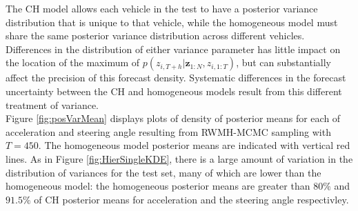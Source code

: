 \documentclass[12pt,a4paper]{article}\usepackage[]{graphicx}\usepackage[]{color}
\begin{document}
\begin{table}[ht]
\centering
{}
\caption{Mean forecast Euclidean error in metres for the the best Naive model, Naive 8, and each time series model at a forecast horizon of one second, two seconds and three seconds. Each time series model performs significantly better than Naive 8, and are very competitive with each other. The use of UVB for the IH model appears to have increased the forecast error relative to MCMC and VB inference for this model.}
\label{table:meanError}
\end{table}

The CH model allows each vehicle in the test to have a posterior variance distribution that is unique to that vehicle, while the homogeneous model must share the same posterior variance distribution across different vehicles. Differences in the distribution of either variance parameter has little impact on the location of the maximum of $p(z_{i, T+h} | \textbf{z}_{1:N}, z_{i, 1:T})$, but can substantially affect the precision of this forecast density. Systematic differences in the forecast uncertainty between the CH and homogeneous models result from this different treatment of variance.
\\

Figure \ref{fig:posVarMean} displays plots of density of posterior means for each of acceleration and steering angle resulting from RWMH-MCMC sampling with $T = 450$. The homogeneous model posterior means are indicated with vertical red lines. As in Figure \ref{fig:HierSingleKDE}, there is a large amount of variation in the distribution of variances for the test set, many of which are lower than the homogeneous model: the homogeneous posterior means are greater than $80\%$ and $91.5\%$ of CH posterior means for acceleration and the steering angle respectivley. 
\\
\end{document}
